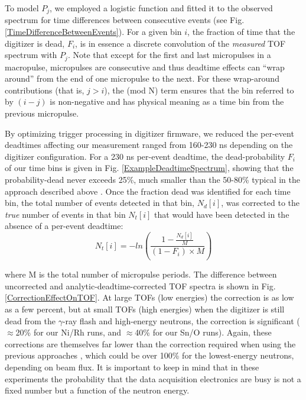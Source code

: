 To model $P_{j}$, we
employed a logistic function and fitted it to the observed spectrum for time
differences between consecutive events (see Fig.  \ref{TimeDifferenceBetweenEvents}).
For a given bin $i$, the fraction of time that the 
digitizer is dead, $F_{i}$, is in essence a discrete convolution of the
\textit{measured} TOF spectrum with $P_{j}$. Note that except for the first and
last micropulses in a macropulse, micropulses are consecutive and thus deadtime effects can
``wrap around'' from the end of one micropulse to the next. For these wrap-around
contributions (that is, $j>i$), the (mod N) term ensures that the bin referred
to by $(i-j)$ is non-negative and has physical meaning as a time bin from the previous 
micropulse.

By optimizing trigger processing in digitizer firmware,
we reduced the per-event deadtimes affecting our
measurement ranged from 160-230 ns depending on the digitizer configuration.
For a 230 ns per-event deadtime, the dead-probability
$F_{i}$ of our time bins is given in Fig.
\ref{ExampleDeadtimeSpectrum}, showing that the probability-dead never exceeds
25\%, much smaller than the 50-80\% typical in the approach described above
\cite{Finlay1993, Abfalterer2001}.
Once the fraction dead was identified for each time bin, the total number of
events detected in that bin, $N_{d}[i]$, was corrected to the \textit{true}
number of events in that bin $N_{t}[i]$ that would have been detected in the
absence of a per-event deadtime:
\begin{equation} \label{DeadtimeEquation}
    N_{t}[i] = -ln\left(\frac{1-\frac{N_{d}[i]}{M}}{(1-F_{i})\times M}\right)
\end{equation}

\noindent
where M is the total number of micropulse periods. The difference between
uncorrected and analytic-deadtime-corrected TOF spectra is shown in Fig.
\ref{CorrectionEffectOnTOF}. At large TOFs (low energies) the correction is as low as a
few percent, but at small TOFs (high energies) when the digitizer is still dead
from the $\gamma$-ray flash and high-energy neutrons, the correction is significant
($\approx$20\% for our Ni/Rh runs, and $\approx$40\% for our Sn/O runs). Again, these 
corrections are themselves far lower than the correction required
when using the previous approaches \cite{Finlay1993, Abfalterer2001}, which
could be over 100\% for the lowest-energy neutrons, depending on beam flux. It is
important to keep in mind that in these experiments the probability that the
data acquisition electronics are busy is not a fixed number but a
function of the neutron energy.

